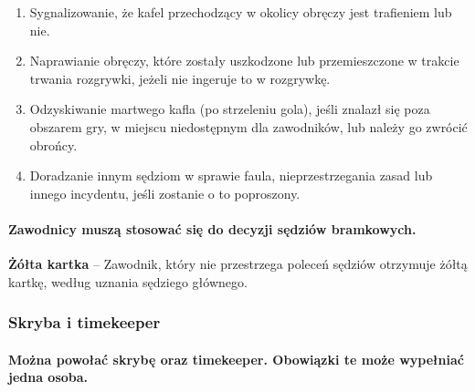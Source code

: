 \documentclass[12pt]{article}
\newcommand\yellowcard[1]{\bgroup\textcolor{darkyellow}{\textbf{#1}}}
\begin{document}
\begin{enumerate}
	\item Sygnalizowanie, że kafel przechodzący w okolicy obręczy jest
	      trafieniem lub nie.

	\item Naprawianie obręczy, które zostały uszkodzone lub przemieszczone w
	      trakcie trwania rozgrywki, jeżeli nie ingeruje to w rozgrywkę.

	\item Odzyskiwanie martwego kafla (po strzeleniu gola), jeśli znalazł się
	      poza obszarem gry, w miejscu niedostępnym dla zawodników, lub należy go
	      zwrócić obrońcy.

	\item Doradzanie innym sędziom w sprawie faula, nieprzestrzegania zasad lub
	      innego incydentu, jeśli zostanie o to poproszony.
\end{enumerate}

\paragraph{Zawodnicy muszą stosować się do decyzji sędziów
	bramkowych.}

\yellowcard{Żółta kartka} -- Zawodnik, który nie przestrzega poleceń sędziów
otrzymuje żółtą kartkę, według uznania sędziego głównego.

\subsubsection{Skryba i timekeeper}

\paragraph{Można powołać skrybę oraz timekeeper. Obowiązki te
	może wypełniać jedna osoba.}
\end{document}
